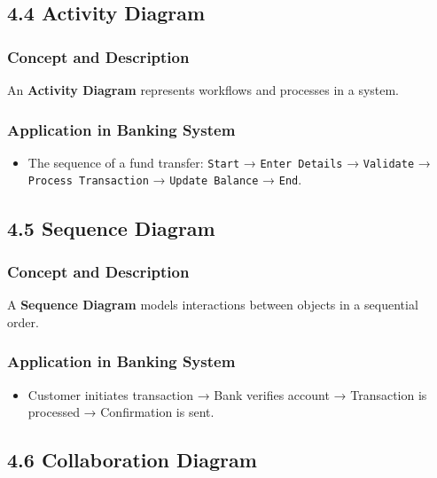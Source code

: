 \subsection{4.4 Activity Diagram}\label{activity-diagram}

\subsubsection{Concept and Description}\label{concept-and-description-4}

An \textbf{Activity Diagram} represents workflows and processes in a
system.

\subsubsection{Application in Banking
System}\label{application-in-banking-system-4}

\begin{itemize}
\item
  The sequence of a fund transfer: \texttt{Start} →
  \texttt{Enter\ Details} → \texttt{Validate} →
  \texttt{Process\ Transaction} → \texttt{Update\ Balance} →
  \texttt{End}.
\end{itemize}

\subsection{4.5 Sequence Diagram}\label{sequence-diagram}

\subsubsection{Concept and Description}\label{concept-and-description-5}

A \textbf{Sequence Diagram} models interactions between objects in a
sequential order.

\subsubsection{Application in Banking
System}\label{application-in-banking-system-5}

\begin{itemize}
\item
  Customer initiates transaction → Bank verifies account → Transaction
  is processed → Confirmation is sent.
\end{itemize}

\subsection{4.6 Collaboration Diagram}\label{collaboration-diagram}

